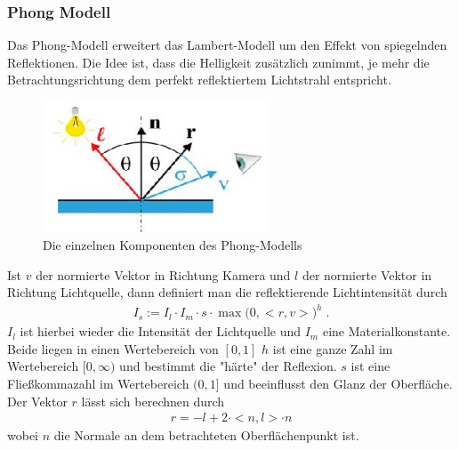    
\subsubsection{Phong Modell}
Das Phong-Modell erweitert das  Lambert-Modell um den Effekt von spiegelnden Reflektionen. Die Idee ist, dass die Helligkeit zusätzlich zunimmt, je mehr die Betrachtungsrichtung dem perfekt reflektiertem Lichtstrahl entspricht.  

\begin{figure}[H]
    \centering
    \includegraphics[width=0.6\textwidth]{images/phong_directions.jpg}
    \caption{Die einzelnen Komponenten des Phong-Modells}
    \label{fig:phong-directions}
\end{figure}

Ist $v$ der normierte Vektor in Richtung Kamera und $l$ der normierte Vektor in Richtung Lichtquelle, dann definiert man die  reflektierende Lichtintensität durch
\begin{align}
I_s := I_l \cdot I_m \cdot s \cdot \max\biggl ( 0, <r,v>\biggr)^h \;.
\end{align}
$I_l$ ist hierbei wieder die Intensität der Lichtquelle und $I_m$ eine Materialkonstante. Beide liegen in einen Wertebereich von $[0,1]$ 
$h$ ist eine ganze Zahl im Wertebereich $[0, \infty)$ und bestimmt die "härte" der Reflexion. $s$ ist eine Fließkommazahl im Wertebereich $(0,1]$ und beeinflusst den Glanz der Oberfläche.
 Der Vektor $r$ lässt sich berechnen durch 
\begin{align}
r = -l + 2 \cdot <n, l> \cdot n
\end{align}
wobei $n$ die Normale an dem betrachteten Oberflächenpunkt ist.

